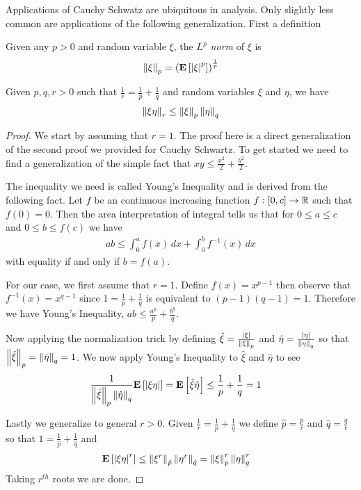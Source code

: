 Applications of Cauchy Schwatz are ubiquitous in analysis.  Only
slightly less common are applications of the following
generalization.  First a definition
\begin{defn}Given any $p > 0$ and random variable $\xi$, the \emph{$L^p$
  norm} of $\xi$ is 
\begin{align*}
\left \lVert \xi \right \rVert_p = \left (\textbf{E}\left[\left \vert \xi \right \vert^p\right] \right )^ {\frac{1}{p}}
\end{align*}
\end{defn}
\begin{lem}\label{Holder}Given $p,q,r > 0$ such
  that $\frac{1}{r} = \frac{1}{p} + \frac{1}{q}$ and random variables
  $\xi$ and $\eta$, we have
\begin{align*}
\left \lVert \xi \eta \right \rVert_r \leq \left \lVert \xi  \right \rVert_p \left \lVert \eta \right \rVert_q
\end{align*}
\end{lem}
\begin{proof}
We start by assuming that $r=1$.  The proof here is a direct generalization of the second proof we
provided for Cauchy Schwartz.  To get started we need to find a
generalization of the simple fact that $xy \leq \frac{x^2}{2} +
\frac{y^2}{2}$.  
 
The inequality we need is called Young's Inequality and is derived
from the following fact.  Let $f$ be an
continuous increasing function $f : [0,c] \to \mathbb{R}$ such that $f(0)
= 0$.  Then the area interpretation of integral tells us that for $0
\leq a \leq c$ and $0 \leq b \leq f(c)$ we have
\begin{align*}
ab \leq \int_0^a f(x) \, dx + \int_0^b f^{-1}(x) \, dx
\end{align*}
with equality if and only if $b=f(a)$.  

For our case, we first assume that $r = 1$.  Define $f(x) =
x^{p-1}$ then observe that $f^{-1}(x) = x^{q-1}$ since
$1 = \frac{1}{p} + \frac{1}{q}$ is equivalent to $(p-1)(q-1) = 1$.
Therefore we have Young's Inequality, $ab \leq \frac{a^p}{p} +
\frac{b^q}{q}$.

Now applying the normalization trick by defining $\hat{\xi} =
\frac{\left \vert \xi \right \vert}{\left \lVert \xi \right \rVert_p}$ and $\hat{\eta} =
\frac{\left \vert \eta \right \vert}{\left \lVert \eta \right \rVert_q}$ so that ${\left \lVert \hat{\xi} \right \rVert_p} =
{\left \lVert \hat{\eta} \right \rVert_q} = 1$.  We now apply Young's Inequality to
$\hat{\xi}$ and $\hat{\eta}$ to see
\begin{align*}
\frac{1}{\left \lVert \hat{\xi} \right \rVert_p \left \lVert \hat{\eta} \right \rVert_q} \textbf{E}\left[\left \vert \xi \eta \right \vert\right] &=
\textbf{E}\left[\hat{\xi}\hat{\eta}\right] \leq \frac{1}{p} + \frac{1}{q} = 1
\end{align*}

Lastly we generalize to general $r>0$.  Given $\frac{1}{r} =
\frac{1}{p} + \frac{1}{q}$ we define $\hat{p} = \frac{p}{r}$ and 
$\hat{q} = \frac{q}{r}$ so that $1 =
\frac{1}{\hat{p}} + \frac{1}{\hat{q}}$ and 
\begin{align*}
\textbf{E}\left[\left \vert \xi \eta \right \vert^r\right] &\leq \left \lVert \xi^r \right \rVert_{\hat{p}}
\left \lVert \eta^r \right \rVert_{\hat{q}} = \left \lVert \xi \right \rVert_p^r \left \lVert \eta \right \rVert_q^r 
\end{align*}
Taking $r^{th}$ roots we are done.
\end{proof}
